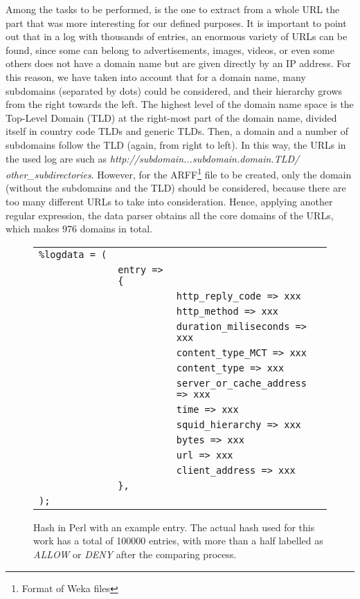 \documentclass{llncs}
\begin{document}
Among the tasks to be performed, is the one to extract from a whole URL the part that was more interesting for our defined purposes. It is important to point out that in a log with thousands of entries, an enormous variety of URLs can be found, since some can belong to advertisements, images, videos, or even some others does not have a domain name but are given directly by an IP address. For this reason, we have taken into account that for a domain name, many subdomains (separated by dots) could be considered, and their hierarchy grows from the right towards the left. The highest level of the domain name space is the Top-Level Domain (TLD) at the right-most part of the domain name, divided itself in country code TLDs and generic TLDs. Then, a domain and a number of subdomains follow the TLD (again, from right to left). In this way, the URLs in the
used log are such as \textit{http://subdomain...subdomain.domain.TLD/} \textit{other\_subdirectories}. However, for the ARFF\footnote{Format of Weka files} file to be created, only the domain (without the subdomains and the TLD) should be considered, because there are too many different URLs to take into consideration. Hence, applying another regular expression, the data parser obtains all the core domains of the URLs, which makes 976 domains in total.

\begin{figure}[htb]
\centering
\begin{tabular}{ p{0.1cm} p{0.1cm} p{6cm} }
  \texttt{\%logdata~=~(} & & \\
   & \texttt{entry~=>\{} & \\
   & & \texttt{http\_reply\_code => xxx} \\
   & & \texttt{http\_method => xxx} \\
   & & \texttt{duration\_miliseconds => xxx} \\
   & & \texttt{content\_type\_MCT => xxx} \\
   & & \texttt{content\_type => xxx} \\
   & & \texttt{server\_or\_cache\_address => xxx} \\
   & & \texttt{time => xxx} \\
   & & \texttt{squid\_hierarchy => xxx} \\
   & & \texttt{bytes => xxx} \\
   & & \texttt{url => xxx} \\
   & & \texttt{client\_address => xxx} \\
   & \texttt{\},} & \\
  \texttt{);} & & \\
\end{tabular}
\caption{Hash in Perl with an example entry. The actual hash used for
  this work has a total of 100000 entries, with more than a half
  labelled as \textit{ALLOW} or \textit{DENY} after the comparing
  process. \label{fig:data_hash}}
\end{figure}
\end{document}
